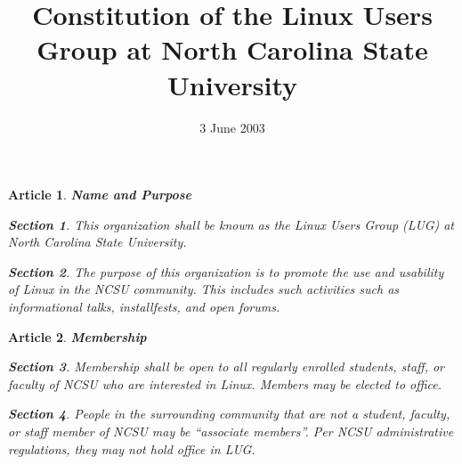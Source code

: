 \documentclass [letterpaper, 12pt]{article}
\newtheorem{art}{Article}
\newtheorem{sect}{Section}[art]
\begin{document}
\title{
Constitution of the Linux Users Group at North Carolina State University}
 
\date{3 June 2003}
\maketitle

\begin{art} {\bf Name and Purpose}
\label{art-name}

\begin{sect}
This organization shall be known as the Linux Users Group (LUG) at North Carolina State University.
\end{sect}

\begin{sect}
The purpose of this organization is to promote the use and usability of Linux
in the NCSU community.  This includes such activities such as informational talks, installfests, and open forums.
\end{sect}

\end{art}

\bigskip
\begin{art} {\bf Membership}
\label{art-memb}

\begin{sect}
Membership shall be open to all regularly enrolled students, staff, or faculty of NCSU who are interested in Linux.  Members may be elected to office.
\end{sect}

\begin{sect}
People in the surrounding community that are not a student, faculty,
or staff member of NCSU may be ``associate members''.  Per NCSU administrative regulations, they may not hold office in LUG.
\end{sect}

\end{art}
\end{document}
